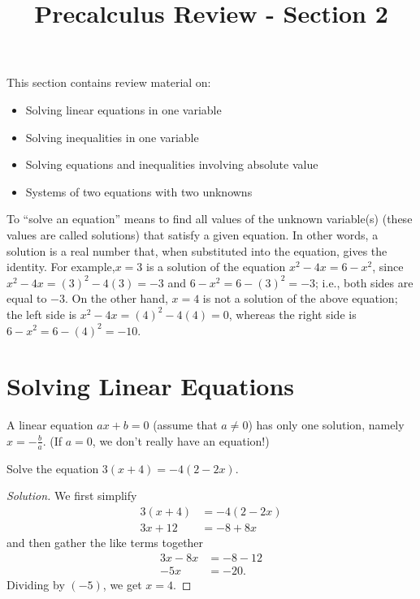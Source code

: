 \documentclass{ximera}
\title{Precalculus Review - Section 2}
\begin{document}
\begin{abstract}
%
\end{abstract}
\maketitle

This section contains review material on:
\begin{itemize}
	\item Solving linear equations in one variable
	\item Solving inequalities in one variable
	\item Solving equations and inequalities involving absolute value
	\item Systems of two equations with two unknowns
\end{itemize}

To ``solve an equation'' means to find all values of the unknown variable(s) (these values are called solutions) that satisfy a given equation. In other words, a solution is a real number that, when substituted into the equation, gives the identity.  For example,$x=3$ is a solution of the equation $x^2-4x = 6-x^2$, since $x^2-4x = (3)^2-4(3) = -3$ and $6-x^2 = 6-(3)^2 = -3$; i.e., both sides are equal to $-3$. On the other hand, $x=4$ is not a solution of the above equation; the left side is $x^2-4x = (4)^2-4(4) = 0$, whereas the right side is $6-x^2 = 6-(4)^2 = -10$.

\section{Solving Linear Equations}
A linear equation $ax+b=0$ (assume that $a \neq 0$) has only one solution, namely $x=-\frac{b}{a}$. (If $a = 0$, we don't really have an equation!)

\begin{example}
Solve the equation $3(x+4) = -4(2-2x)$.
\end{example}
\begin{proof}[Solution]
We first simplify
\begin{align*}
	3(x+4) &= -4(2-2x)\\
	3x+12 &= -8 + 8x
\end{align*}
and then gather the like terms together
\begin{align*}
	3x-8x &= -8 - 12\\
	-5x &= -20.
\end{align*}
Dividing by $(-5)$, we get $x=4$.
\end{proof}
\end{document}

